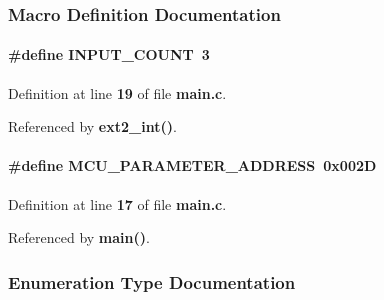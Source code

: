 \subsubsection{Macro Definition Documentation}
\paragraph[{I\+N\+P\+U\+T\+\_\+\+C\+O\+U\+NT}]{\setlength{\rightskip}{0pt plus 5cm}\#define I\+N\+P\+U\+T\+\_\+\+C\+O\+U\+NT~3}\label{main_8c_a08f4cb5cb205c824902548906a61cb60}


Definition at line {\bf 19} of file {\bf main.\+c}.



Referenced by {\bf ext2\+\_\+int()}.

\paragraph[{M\+C\+U\+\_\+\+P\+A\+R\+A\+M\+E\+T\+E\+R\+\_\+\+A\+D\+D\+R\+E\+SS}]{\setlength{\rightskip}{0pt plus 5cm}\#define M\+C\+U\+\_\+\+P\+A\+R\+A\+M\+E\+T\+E\+R\+\_\+\+A\+D\+D\+R\+E\+SS~0x002D}\label{main_8c_a8f031e543cbfc816ce9e5dec4d123a2c}


Definition at line {\bf 17} of file {\bf main.\+c}.



Referenced by {\bf main()}.



\subsubsection{Enumeration Type Documentation}
